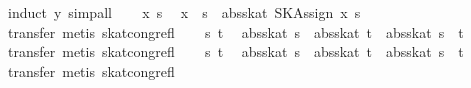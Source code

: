 \begin{isabellebody}
%
\isatagproof
{}\isamarkupfalse%
\ {}induct\ y{}\ simp{}all{}\isanewline
\ \ \isamarkupfalse%
\ x\ s\ \isamarkupfalse%
\ {}x\ {}{}\ s\ {}\ abs{}skat\ {}SKAssign\ x\ s{}{}\isanewline
\ \ \ \ \isamarkupfalse%
\ {}transfer{}\ metis\ skat{}cong{}refl{}\isanewline
{}\isamarkupfalse%
\isanewline
\ \ \isamarkupfalse%
\ s\ t\ \isamarkupfalse%
\ {}abs{}skat\ s\ {}\ abs{}skat\ t\ {}\ abs{}skat\ {}s\ {}\ t{}{}\isanewline
\ \ \ \ \isamarkupfalse%
\ {}transfer{}\ metis\ skat{}cong{}refl{}\isanewline
{}\isamarkupfalse%
\isanewline
\ \ \isamarkupfalse%
\ s\ t\ \isamarkupfalse%
\ {}abs{}skat\ s\ {}\ abs{}skat\ t\ {}\ abs{}skat\ {}s\ {}\ t{}{}\isanewline
\ \ \ \ \isamarkupfalse%
\ {}transfer{}\ metis\ skat{}cong{}refl{}\isanewline
{}\isamarkupfalse%
\isanewline
\ \ \isamarkupfalse%

\end{isabellebody}
